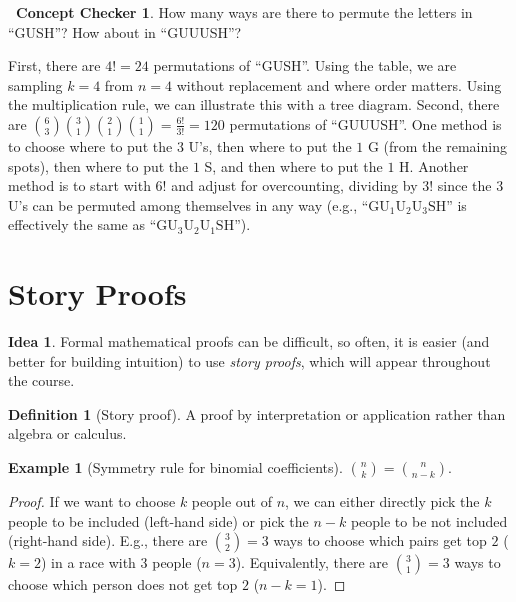 \documentclass[12pt,oneside]{article}
\theoremstyle{definition}
\newtheorem{definition}{Definition}
\newtheorem{example}{Example}
\newtheorem{concept}{\faPen \ Concept Checker}
\newtheorem*{idea}{Idea}
\theoremstyle{remark}
\begin{document}
\begin{concept}
How many ways are there to permute the letters in \enquote{GUSH}? How about in \enquote{GUUUSH}?
\end{concept}

\begin{solutionbox}
First, there are $4! = 24$ permutations of \enquote{GUSH}. Using the table, we are sampling $k = 4$ from $n = 4$ without replacement and where order matters. Using the multiplication rule, we can illustrate this with a tree diagram. Second, there are $\binom{6}{3} \binom{3}{1} \binom{2}{1} \binom{1}{1} = \frac{6!}{3!} = 120$ permutations of \enquote{GUUUSH}. One method is to choose where to put the $3$ U's, then where to put the $1$ G (from the remaining spots), then where to put the $1$ S, and then where to put the $1$ H. Another method is to start with $6!$ and adjust for overcounting, dividing by $3!$ since the $3$ U's can be permuted among themselves in any way (e.g., \enquote{$\text{G} \text{U}_1 \text{U}_2 \text{U}_3 \text{S} \text{H}$} is effectively the same as \enquote{$\text{G} \text{U}_3 \text{U}_2 \text{U}_1 \text{S} \text{H}$}).
\end{solutionbox}

\section{Story Proofs}

\begin{idea}
Formal mathematical proofs can be difficult, so often, it is easier (and better for building intuition) to use \textit{story proofs}, which will appear throughout the course.
\end{idea}

\begin{definition}[Story proof]
A proof by interpretation or application rather than algebra or calculus.
\end{definition}

\begin{example}[Symmetry rule for binomial coefficients]
$\binom{n}{k} = \binom{n}{n - k}$.
\end{example}

\begin{proof}
If we want to choose $k$ people out of $n$, we can either directly pick the $k$ people to be included (left-hand side) or pick the $n - k$ people to be not included (right-hand side). E.g., there are $\binom{3}{2} = 3$ ways to choose which pairs get top $2$ ($k = 2$) in a race with $3$ people ($n = 3$). Equivalently, there are $\binom{3}{1} = 3$ ways to choose which person does not get top $2$ ($n - k = 1$).
\end{proof}
\end{document}
